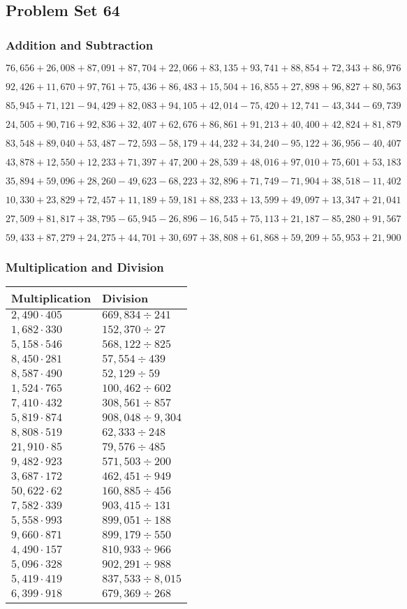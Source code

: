 \hypertarget{problem-set-64}{%
\subsection{Problem Set 64}\label{problem-set-64}}

\hypertarget{addition-and-subtraction-286}{%
\subsubsection{Addition and
Subtraction}\label{addition-and-subtraction-286}}

\(76,656+26,008+87,091+87,704+22,066+83,135+93,741+88,854+72,343+ 86,976\)

\(92,426+11,670+97,761+75,436+86,483+15,504+16,855+27,898+96,827+80,563\)

\(85,945+71,121-94,429+82,083+94,105+42,014-75,420+12,741-43,344-69,739\)

\(24,505+90,716+92,836+32,407+62,676+86,861+91,213+40,400+42,824+81,879\)

\(83,548+89,040+53,487-72,593-58,179+44,232+34,240-95,122+36,956-40,407\)

\(43,878+12,550+12,233+71,397+47,200+28,539+48,016+97,010+75,601+53,183\)

\(35,894+59,096+28,260-49,623-68,223+32,896+71,749-71,904+38,518-11,402\)

\(10,330+23,829+72,457+11,189+59,181+88,233+13,599+49,097+13,347+21,041\)

\(27,509+81,817+38,795-65,945-26,896-16,545+75,113+21,187-85,280+91,567\)

\(59,433+87,279+24,275+44,701+30,697+38,808+61,868+59,209+55,953+21,900\)

\hypertarget{multiplication-and-division-285}{%
\subsubsection{Multiplication and
Division}\label{multiplication-and-division-285}}

\begin{longtable}[]{@{}ll@{}}
\toprule
Multiplication & Division\tabularnewline
\midrule
\endhead
\(2,490\cdot405\) & \(669,834÷241\)\tabularnewline
\(1,682\cdot330\) & \(152,370 ÷27\)\tabularnewline
\(5,158\cdot546\) & \(568,122÷825\)\tabularnewline
\(8,450\cdot281\) & \(57,554 ÷439\)\tabularnewline
\(8,587\cdot490\) & \(52,129÷59\)\tabularnewline
\(1,524\cdot765\) & \(100,462÷602\)\tabularnewline
\(7,410\cdot432\) & \(308,561÷857\)\tabularnewline
\(5,819\cdot874\) & \(908,048÷9,304\)\tabularnewline
\(8,808\cdot519\) & \(62,333÷248\)\tabularnewline
\(21,910\cdot85\) & \(79,576÷485\)\tabularnewline
\(9,482\cdot923\) & \(571,503÷200\)\tabularnewline
\(3,687\cdot172\) & \(462,451÷949\)\tabularnewline
\(50,622\cdot62\) & \(160,885÷456\)\tabularnewline
\(7,582\cdot339\) & \(903,415÷131\)\tabularnewline
\(5,558\cdot993\) & \(899,051÷188\)\tabularnewline
\(9,660\cdot871\) & \(899,179÷550\)\tabularnewline
\(4,490\cdot157\) & \(810,933÷966\)\tabularnewline
\(5,096\cdot328\) & \(902,291÷988\)\tabularnewline
\(5,419\cdot419\) & \(837,533÷8,015\)\tabularnewline
\(6,399\cdot918\) & \(679,369÷268\)\tabularnewline
\bottomrule
\end{longtable}

